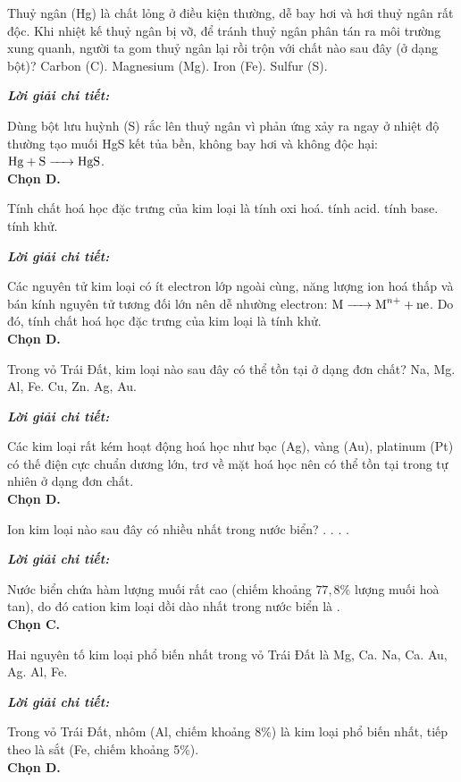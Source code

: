 \documentclass[11pt,a4paper]{article}
\def\loigiai#1{
\par\begingroup\color{blue!80!black}\small
\noindent\textbf{\textit{Lời giải chi tiết:}}\par
#1\par\endgroup}
\begin{document}
\begin{ex}
Thuỷ ngân (Hg) là chất lỏng ở điều kiện thường, dễ bay hơi và hơi thuỷ ngân rất độc. Khi nhiệt kế thuỷ ngân bị vỡ, để tránh thuỷ ngân phân tán ra môi trường xung quanh, người ta gom thuỷ ngân lại rồi trộn với chất nào sau đây (ở dạng bột)?
\choice
{Carbon (C).}
{Magnesium (Mg).}
{Iron (Fe).}
{\True Sulfur (S).}
\loigiai{
Dùng bột lưu huỳnh (S) rắc lên thuỷ ngân vì phản ứng xảy ra ngay ở nhiệt độ thường tạo muối HgS kết tủa bền, không bay hơi và không độc hại: $\ce{Hg + S -> HgS}$.\\
\textbf{Chọn D.}}
\end{ex}

\begin{ex}
Tính chất hoá học đặc trưng của kim loại là
\choice
{tính oxi hoá.}
{tính acid.}
{tính base.}
{\True tính khử.}
\loigiai{
Các nguyên tử kim loại có ít electron lớp ngoài cùng, năng lượng ion hoá thấp và bán kính nguyên tử tương đối lớn nên dễ nhường electron: $\ce{M -> M^{n+} + ne}$. Do đó, tính chất hoá học đặc trưng của kim loại là tính khử.\\
\textbf{Chọn D.}}
\end{ex}

\begin{ex}
Trong vỏ Trái Đất, kim loại nào sau đây có thể tồn tại ở dạng đơn chất?
\choice
{Na, Mg.}
{Al, Fe.}
{Cu, Zn.}
{\True Ag, Au.}
\loigiai{
Các kim loại rất kém hoạt động hoá học như bạc (Ag), vàng (Au), platinum (Pt) có thế điện cực chuẩn dương lớn, trơ về mặt hoá học nên có thể tồn tại trong tự nhiên ở dạng đơn chất.\\
\textbf{Chọn D.}}
\end{ex}

\begin{ex}
Ion kim loại nào sau đây có nhiều nhất trong nước biển?
\choice
{.}
{.}
{\True {}.}
{.}
\loigiai{
Nước biển chứa hàm lượng muối  rất cao (chiếm khoảng $77{,}8\%$ lượng muối hoà tan), do đó cation kim loại dồi dào nhất trong nước biển là \ce{Na+}.\\
\textbf{Chọn C.}}
\end{ex}

\begin{ex}
Hai nguyên tố kim loại phổ biến nhất trong vỏ Trái Đất là
\choice
{Mg, Ca.}
{Na, Ca.}
{Au, Ag.}
{\True Al, Fe.}
\loigiai{
Trong vỏ Trái Đất, nhôm (Al, chiếm khoảng 8\%) là kim loại phổ biến nhất, tiếp theo là sắt (Fe, chiếm khoảng 5\%).\\
\textbf{Chọn D.}}
\end{ex}
\end{document}
